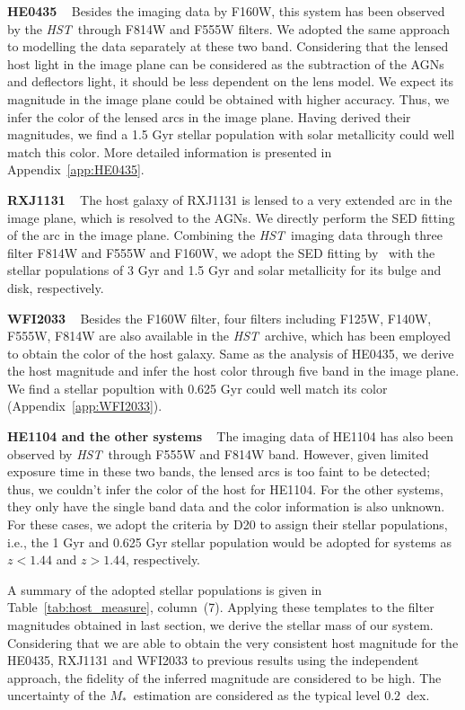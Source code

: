 \documentclass[fleqn,usenatbib]{mnras}
\newcommand{\hst}{{\it HST}}
\newcommand{\mstar}{{$M_*$}}
\begin{document}
{\bf HE0435} ~ Besides the imaging data by F160W, this system has been observed by the \hst\ through F814W and F555W filters. We adopted the same approach to modelling the data separately at these two band. Considering that the lensed host light in the image plane can be considered as the subtraction of the AGNs and deflectors light, it should be less dependent on the lens model. We expect its magnitude in the image plane could be obtained with higher accuracy. Thus, we infer the color of the lensed arcs in the image plane. Having derived their magnitudes, we find a 1.5 Gyr stellar population with solar metallicity could well match this color. More detailed information is presented in Appendix~\ref{app:HE0435}.

{\bf RXJ1131} ~ The host galaxy of RXJ1131 is lensed to a very extended arc in the image plane, which is resolved to the AGNs. We directly perform the SED fitting of the arc in the image plane. Combining the \hst\ imaging data through three filter F814W and F555W and F160W, we adopt the SED fitting by~\citet{Ding2017b} with the stellar populations of 3 Gyr and 1.5 Gyr and solar metallicity for its bulge and disk, respectively.

{\bf WFI2033} ~ Besides the F160W filter, four filters including F125W, F140W, F555W, F814W are also available in the \hst\ archive, which has been employed to obtain the color of the host galaxy. Same as the analysis of HE0435, we derive the host magnitude and infer the host color through five band in the image plane. We find a stellar popultion with 0.625 Gyr could well match its color (Appendix~\ref{app:WFI2033}).

{\bf HE1104 and the other systems} ~ The imaging data of HE1104 has also been observed by \hst\ through F555W and F814W band. However, given limited exposure time in these two bands, the lensed arcs is too faint to be detected; thus, we couldn't infer the color of the host for HE1104. For the other systems, they only have the single band data and the color information is also unknown. For these cases, we adopt the criteria by D20 to assign their stellar populations, i.e., the 1 Gyr and 0.625 Gyr stellar population would be adopted for systems as $z<1.44$ and $z>1.44$, respectively.

A summary of the adopted stellar populations is given in Table~\ref{tab:host_measure}, column~(7). Applying these templates to the filter magnitudes obtained in last section, we derive the stellar mass of our system. Considering that we are able to obtain the very consistent host magnitude for the HE0435, RXJ1131 and WFI2033 to previous results using the independent approach, the fidelity of the inferred magnitude are considered to be high. The uncertainty of the \mstar\ estimation are considered as the typical level $0.2$~dex.
\end{document}
